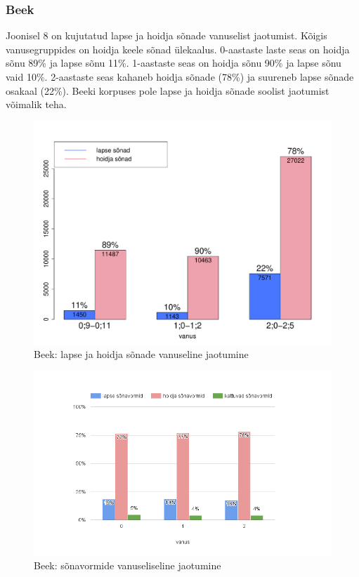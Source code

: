 \documentclass[12pt]{article}
\begin{document}
\subsubsection{Beek}

Joonisel 8 on kujutatud lapse ja hoidja sõnade vanuselist jaotumist. Kõigis vanusegruppides on hoidja keele sõnad ülekaalus. 0-aastaste laste seas on hoidja sõnu 89\% ja lapse sõnu 11\%. 1-aastaste seas on hoidja sõnu 90\% ja lapse sõnu vaid 10\%. 2-aastaste seas kahaneb hoidja sõnade (78\%) ja suureneb lapse sõnade osakaal (22\%). Beeki korpuses pole lapse ja hoidja sõnade soolist jaotumist võimalik teha.

\begin{figure}[H]
    \centering
    \includegraphics[width=12cm]{beek_vanus_sonad}
    \caption{Beek: lapse ja hoidja sõnade vanuseline jaotumine}
\end{figure}



\begin{figure}[H]
    \centering
    \includegraphics[width=12cm]{beek_vanus_vormid}
    \caption{Beek: sõnavormide vanuseliseline jaotumine}
\end{figure}
\end{document}
